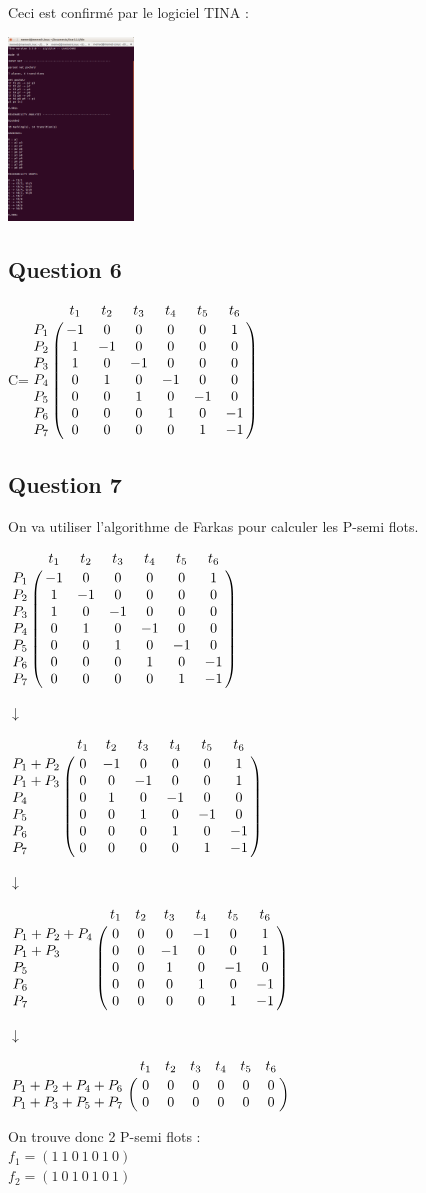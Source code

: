 \vspace{1cm}

Ceci est confirmé par le logiciel TINA :
\begin{center}
  \includegraphics[width=0.25\textwidth]{images/marquage_pochoir.png}
\end{center}

\subsection{Question 6}

\vspace{1cm}

\begin{center}

{\Huge C}\qquad =\qquad $\bordermatrix{
&t_1&t_2&t_3&t_4&t_5&t_6\cr
P_1&-1&0&0&0&0&1\cr
P_2&1&-1&0&0&0&0\cr
P_3&1&0&-1&0&0&0\cr
P_4&0&1&0&-1&0&0\cr
P_5&0&0&1&0&-1&0\cr
P_6&0&0&0&1&0&-1\cr
P_7&0&0&0&0&1&-1\cr
}$

\end{center}

\subsection{Question 7}
On va utiliser l'algorithme de Farkas pour calculer les P-semi flots.

\begin{center}

$\bordermatrix{
&t_1&t_2&t_3&t_4&t_5&t_6\cr
P_1&-1&0&0&0&0&1\cr
P_2&1&-1&0&0&0&0\cr
P_3&1&0&-1&0&0&0\cr
P_4&0&1&0&-1&0&0\cr
P_5&0&0&1&0&-1&0\cr
P_6&0&0&0&1&0&-1\cr
P_7&0&0&0&0&1&-1\cr
}$

{\Huge $\downarrow$}

$\bordermatrix{
&t_1&t_2&t_3&t_4&t_5&t_6\cr
P_1+P_2&0&-1&0&0&0&1\cr
P_1+P_3&0&0&-1&0&0&1\cr
P_4&0&1&0&-1&0&0\cr
P_5&0&0&1&0&-1&0\cr
P_6&0&0&0&1&0&-1\cr
P_7&0&0&0&0&1&-1\cr
}$

{\Huge $\downarrow$}

$\bordermatrix{
&t_1&t_2&t_3&t_4&t_5&t_6\cr
P_1+P_2+P_4&0&0&0&-1&0&1\cr
P_1+P_3&0&0&-1&0&0&1\cr
P_5&0&0&1&0&-1&0\cr
P_6&0&0&0&1&0&-1\cr
P_7&0&0&0&0&1&-1\cr
}$

{\Huge $\downarrow$}

$\bordermatrix{
&t_1&t_2&t_3&t_4&t_5&t_6\cr
P_1+P_2+P_4+P_6&0&0&0&0&0&0\cr
P_1+P_3+P_5+P_7&0&0&0&0&0&0\cr
}$

\vspace{1cm}

On trouve donc 2 P-semi flots :\\
$f_1 = (1\ 1\ 0\ 1\ 0\ 1\ 0)$\\
$f_2 = (1\ 0\ 1\ 0\ 1\ 0\ 1)$

\end{center}

